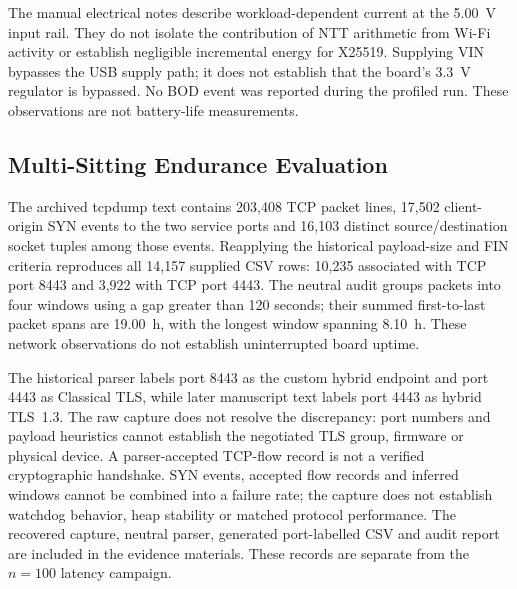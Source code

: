 \documentclass[journal, 10pt]{IEEEtran}
\begin{document}
\begin{table}[htbp]
\caption{Comparative Electrical Power Profile (Isolated UNI-T UTP1310 Bench Supply, 5.00V)}
\begin{center}
\label{tab:power}
\end{center}
\end{table}

The manual electrical notes describe workload-dependent current at the 5.00~V input rail. They do not isolate the contribution of NTT arithmetic from Wi-Fi activity or establish negligible incremental energy for X25519. Supplying VIN bypasses the USB supply path; it does not establish that the board's 3.3~V regulator is bypassed. No BOD event was reported during the profiled run. These observations are not battery-life measurements.

\subsection{Multi-Sitting Endurance Evaluation}
The archived tcpdump text contains 203,408 TCP packet lines, 17,502 client-origin SYN events to the two service ports and 16,103 distinct source/destination socket tuples among those events. Reapplying the historical payload-size and FIN criteria reproduces all 14,157 supplied CSV rows: 10,235 associated with TCP port 8443 and 3,922 with TCP port 4443. The neutral audit groups packets into four windows using a gap greater than 120 seconds; their summed first-to-last packet spans are 19.00~h, with the longest window spanning 8.10~h. These network observations do not establish uninterrupted board uptime.


The historical parser labels port 8443 as the custom hybrid endpoint and port 4443 as Classical TLS, while later manuscript text labels port 4443 as hybrid TLS~1.3. The raw capture does not resolve the discrepancy: port numbers and payload heuristics cannot establish the negotiated TLS group, firmware or physical device. A parser-accepted TCP-flow record is not a verified cryptographic handshake. SYN events, accepted flow records and inferred windows cannot be combined into a failure rate; the capture does not establish watchdog behavior, heap stability or matched protocol performance. The recovered capture, neutral parser, generated port-labelled CSV and audit report are included in the evidence materials. These records are separate from the $n=100$ latency campaign.
\end{document}
